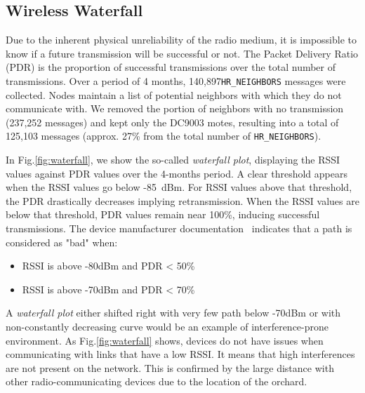 \documentclass{sig-alternate}
\newcommand{\HRNEIGHBORS}              {{\tt HR\_NEIGHBORS}\xspace}
\newcommand{\HRNEIGHBORSTOTALNUMBER}   {140,897}
\begin{document}
\subsection{Wireless Waterfall}


Due to the inherent physical unreliability of the radio medium, it is impossible to know if a future transmission will be successful or not.
The Packet Delivery Ratio (PDR) is the proportion of successful transmissions over the total number of transmissions.
Over a period of 4 months, \HRNEIGHBORSTOTALNUMBER \HRNEIGHBORS messages were collected.
Nodes maintain a list of potential neighbors with which they do not communicate with.
We removed the portion of neighbors with no transmission (237,252 messages) and kept only the DC9003 motes, resulting into a total of 125,103 messages (approx. 27\% from the total number of \HRNEIGHBORS).


In Fig.\ref{fig:waterfall}, we show the so-called \textit{waterfall plot}, displaying the RSSI values against PDR values over the 4-months period.
A clear threshold appears when the RSSI values go below -85~dBm.
For RSSI values above that threshold, the PDR drastically decreases implying retransmission.
When the RSSI values are below that threshold, PDR values remain near 100\%, inducing successful transmissions.
The device manufacturer documentation~\cite{smip_app_note} indicates that a path is considered as "bad" when:

\begin{itemize}
  \item RSSI is above -80dBm and PDR < 50\%
  \item RSSI is above -70dBm and PDR < 70\%
\end{itemize}


A \textit{waterfall plot} either shifted right with very few path below -70dBm or with non-constantly decreasing curve would be an example of interference-prone environment.
As Fig.\ref{fig:waterfall} shows, devices do not have issues when communicating with links that have a low RSSI.
It means that high interferences are not present on the network.
This is confirmed by the large distance with other radio-communicating devices due to the location of the orchard.
\end{document}
